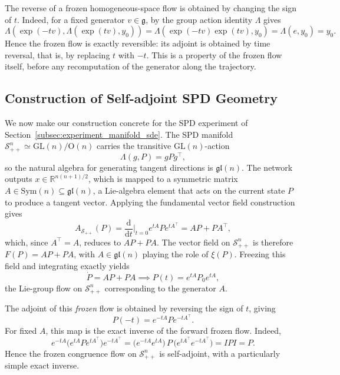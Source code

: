 \documentclass{article}
\theoremstyle{definition}
\theoremstyle{remark}
\begin{document}
The reverse of a frozen homogeneous-space flow is obtained by changing the sign of \(t\). Indeed, for a fixed generator \(v \in \mathfrak{g}\), by the group action identity \(\Lambda\) gives
\begin{equation}
    \Lambda\!\left(\exp(-tv), \Lambda(\exp(tv), y_0)\right)
    =
    \Lambda\!\left(\exp(-tv)\exp(tv), y_0\right)
    =
    \Lambda(e, y_0)
    =
    y_0.
\end{equation}
Hence the frozen flow is exactly reversible: its adjoint is obtained by time reversal, that is, by replacing \(t\) with \(-t\). This is a property of the frozen flow itself, before any recomputation of the generator along the trajectory.

\subsection{Construction of Self-adjoint SPD Geometry}
\label{subsec:spd_geometry}
We now make our construction concrete for the SPD experiment of Section~\ref{subsec:experiment_manifold_sde}.
The SPD manifold $\mathcal{S}_{++}^n \simeq \mathrm{GL}(n)/\mathrm{O}(n)$ carries the transitive
$\mathrm{GL}(n)$-action
\begin{equation}
    \Lambda(g, P) = g P g^\top,
\end{equation}
so the natural algebra for generating tangent directions is $\mathfrak{gl}(n)$. The network outputs
$x \in \mathbb{R}^{n(n+1)/2}$, which is mapped to a symmetric matrix
$A \in \mathrm{Sym}(n) \subseteq \mathfrak{gl}(n)$, a Lie-algebra element that acts on the current
state $P$ to produce a tangent vector. Applying the fundamental vector field construction gives
\begin{equation}
    A_{\mathcal{S}_{++}}(P)
    = \frac{\mathrm{d}}{\mathrm{d}t}\bigg|_{t=0} e^{tA} P e^{tA^\top}
    = AP + PA^\top,
\end{equation}
which, since $A^\top = A$, reduces to $AP + PA$. The vector field on $\mathcal{S}_{++}^n$ is
therefore $F(P) = AP + PA$, with $A \in \mathfrak{gl}(n)$ playing the role of $\xi(P)$. Freezing
this field and integrating exactly yields
\begin{equation}
    \dot{P} = AP + PA \implies P(t) = e^{tA} P_0 e^{tA},
\end{equation}
the Lie-group flow on $\mathcal{S}_{++}^n$ corresponding to the generator $A$.

The adjoint of this \emph{frozen} flow is obtained by reversing the sign of \(t\), giving
\begin{equation}
    P(-t) = e^{-tA} P e^{-tA^\top}.
\end{equation}
For fixed \(A\), this map is the exact inverse of the forward frozen flow. Indeed,
\begin{equation}
    e^{-tA} \bigl(e^{tA} P e^{tA^\top}\bigr) e^{-tA^\top}
    =
    \bigl(e^{-tA}e^{tA}\bigr)\, P \,\bigl(e^{tA^\top}e^{-tA^\top}\bigr)
    = IPI = P.
\end{equation}
Hence the frozen congruence flow on \(\mathcal{S}_{++}^n\) is self-adjoint, with a particularly simple exact inverse.
\end{document}
